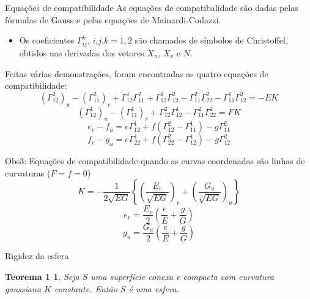 \documentclass[blue]{beamer}
\newtheorem{thm}{Teorema 1}
\newcommand{\Gij}[2]{\Gamma_{#1}^{#2}}
\begin{document}
\begin{frame}{Equações de compatibilidade}
\justifying
\hspace{0.2cm}As equações de compatibalidade são dadas pelas fórmulas de Gauss e pelas equações de Mainardi-Codazzi. 
\begin{itemize}
	\justifying
	\item Os coeficientes $\Gij{ij}{k}$, $i$,$j$,$k = 1,2$ são chamados de símbolos de Christoffel, obtidos nas derivadas dos vetores $X_u$, $X_v$ e $N$.
\end{itemize}
\hspace{0.2cm}Feitas várias demonstrações, foram encontradas as quatro equações de compatibilidade:
\begin{equation}
(\Gij{12}{2})_u-(\Gij{11}{2})_v+\Gij{12}{1}\Gij{11}{2}+\Gij{12}{2}\Gij{12}{2}-\Gij{11}{2}\Gij{22}{2}-\Gij{11}{1}\Gij{12}{2}=-EK
\end{equation}
\begin{equation}
(\Gij{12}{1})_u-(\Gij{11}{1})_v+\Gij{12}{2}\Gij{12}{1}-\Gij{11}{2}\Gij{22}{1}=FK
\end{equation}
\begin{equation}
e_v-f_u=e\Gij{12}{1}+f(\Gij{12}{2}-\Gij{11}{1})-g\Gij{11}{2}
\end{equation}
\begin{equation}
f_v-g_u=e\Gij{22}{1}+f(\Gij{22}{2}-\Gij{12}{1})-g\Gij{12}{2}
\end{equation}

\end{frame}

\begin{frame}
\justify
Obs3: Equações de compatibilidade quando as curvas coordenadas são linhas de curvaturas ($F = f = 0$)
\begin{equation}
K=-\frac{1}{2\sqrt{EG}}\left\{\left(\frac{E_v}{\sqrt{EG}}\right)_v+\left(\frac{G_u}{\sqrt{EG}}\right)_u \right\} \tag{1} \label{gauss}
\end{equation}
\begin{equation}
e_v=\frac{E_v}{2}\left(\frac{e}{E}+\frac{g}{G}\right) \tag{3} \label{1}
\end{equation}
\begin{equation}
g_u=\frac{G_u}{2}\left(\frac{e}{E}+\frac{g}{G}\right) \tag{4} \label{2}
\end{equation}
\end{frame}

\begin{frame}{Rigidez da esfera}
\begin{thm}
	Seja $S$ uma superfície conexa e compacta com curvatura gaussiana $K$ constante. Então $S$ é uma esfera.
\end{thm}
\end{frame}
\end{document}
